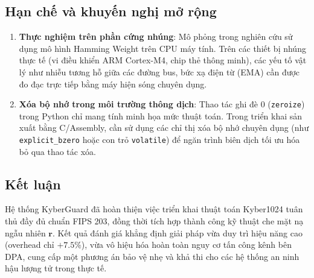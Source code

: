 \documentclass[../LuanVan.tex]{subfiles}
\begin{document}
\subsection{Hạn chế và khuyến nghị mở rộng}

\begin{enumerate}[leftmargin=2cm]
    \item \textbf{Thực nghiệm trên phần cứng nhúng}: Mô phỏng trong nghiên cứu sử dụng mô hình Hamming Weight trên CPU máy tính. Trên các thiết bị nhúng thực tế (vi điều khiển ARM Cortex-M4, chip thẻ thông minh), các yếu tố vật lý như nhiễu tương hỗ giữa các đường bus, bức xạ điện từ (EMA) cần được đo đạc trực tiếp bằng máy hiện sóng chuyên dụng.
    \item \textbf{Xóa bộ nhớ trong môi trường thông dịch}: Thao tác ghi đè 0 (\texttt{zeroize}) trong Python chỉ mang tính minh họa mức thuật toán. Trong triển khai sản xuất bằng C/Assembly, cần sử dụng các chỉ thị xóa bộ nhớ chuyên dụng (như \texttt{explicit\_bzero} hoặc con trỏ \texttt{volatile}) để ngăn trình biên dịch tối ưu hóa bỏ qua thao tác xóa.
\end{enumerate}

\subsection{Kết luận}

Hệ thống KyberGuard đã hoàn thiện việc triển khai thuật toán Kyber1024 tuân thủ đầy đủ chuẩn FIPS 203, đồng thời tích hợp thành công kỹ thuật che mặt nạ ngẫu nhiên $\mathbf{r}$. Kết quả đánh giá khẳng định giải pháp vừa duy trì hiệu năng cao (overhead chỉ $+7.5\%$), vừa vô hiệu hóa hoàn toàn nguy cơ tấn công kênh bên DPA, cung cấp một phương án bảo vệ nhẹ và khả thi cho các hệ thống an ninh hậu lượng tử trong thực tế.
\end{document}
